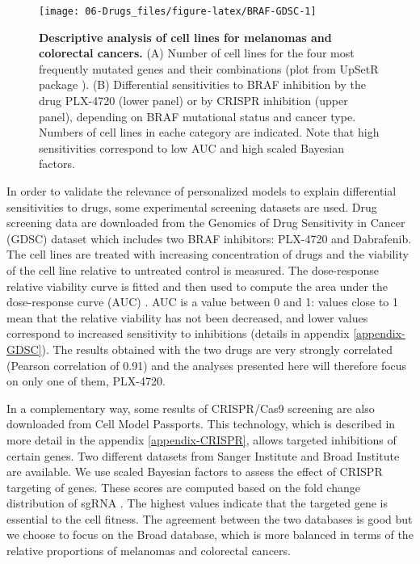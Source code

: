 \documentclass[a4paper,12pt,twoside,onecolumn,openright,final,oldfontcommands]{memoir}
\begin{document}
\begin{figure}

{\centering \texttt{[image: 06-Drugs\_files/figure-latex/BRAF-GDSC-1]} 

}

\caption[Descriptive analysis of cell lines for melanomas and colorectal cancers]{\textbf{Descriptive analysis of cell lines for
melanomas and colorectal cancers.} (A) Number of cell lines for the four
most frequently mutated genes and their combinations (plot from UpSetR
package \citep{conway2017upsetr}). (B) Differential sensitivities to
BRAF inhibition by the drug PLX-4720 (lower panel) or by CRISPR
inhibition (upper panel), depending on BRAF mutational status and cancer
type. Numbers of cell lines in eache category are indicated. Note that
high sensitivities correspond to low AUC and high scaled Bayesian
factors.}\label{fig:BRAF-GDSC}
\end{figure}











In order to validate the relevance of personalized models to explain
differential sensitivities to drugs, some experimental screening
datasets are used. Drug screening data are downloaded from the Genomics
of Drug Sensitivity in Cancer (GDSC) dataset \citep{yang2012genomics}
which includes two BRAF inhibitors: PLX-4720 and Dabrafenib. The cell
lines are treated with increasing concentration of drugs and the
viability of the cell line relative to untreated control is measured.
The dose-response relative viability curve is fitted and then used to
compute the area under the dose-response curve (AUC)
\citep{vis2016multilevel}. AUC is a value between 0 and 1: values close
to 1 mean that the relative viability has not been decreased, and lower
values correspond to increased sensitivity to inhibitions (details in
appendix \ref{appendix-GDSC}). The results obtained with the two drugs
are very strongly correlated (Pearson correlation of 0.91) and the
analyses presented here will therefore focus on only one of them,
PLX-4720.

In a complementary way, some results of CRISPR/Cas9 screening are also
downloaded from Cell Model Passports. This technology, which is
described in more detail in the appendix \ref{appendix-CRISPR}, allows
targeted inhibitions of certain genes. Two different datasets from
Sanger Institute \citep{behan2019prioritization} and Broad Institute
\citep{meyers2017computational} are available. We use scaled Bayesian
factors to assess the effect of CRISPR targeting of genes. These scores
are computed based on the fold change distribution of sgRNA
\citep{hart2016bagel}. The highest values indicate that the targeted
gene is essential to the cell fitness. The agreement between the two
databases is good \citep{dempster2019agreement} but we choose to focus
on the Broad database, which is more balanced in terms of the relative
proportions of melanomas and colorectal cancers.
\end{document}
